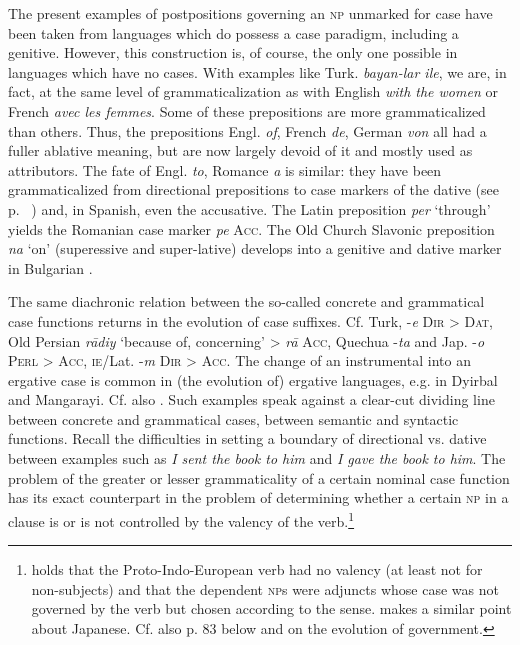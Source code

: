 \label{page88}The present examples of postpositions governing an \textsc{np} unmarked for case have been taken from languages which do possess a case paradigm, including a genitive. However, this construction is, of course, the only one possible in languages which have no cases. With examples like Turk. \textit{bayan-lar ile}, we are, in fact, at the same level of grammaticalization as with English \textit{with the women} or French \textit{avec les femmes}. Some of these prepositions are more grammaticalized than others. Thus, the prepositions Engl. \textit{of}, French \textit{de}, German \textit{von} all had a fuller ablative meaning, but are now largely devoid of it and mostly used as attributors. The fate of Engl. \textit{to}, Romance \textit{a} is similar: they have been grammaticalized from directional prepositions to case markers of the dative (see p.~\pageref{page100}\chk%
)  and, in Spanish, even the accusative. The Latin preposition \textit{per} ‘through’ yields the Romanian case marker \textit{pe} \textsc{Acc}. The Old Church Slavonic preposition \textit{na} ‘on’ (superessive and super-lative) develops into a genitive and dative marker in Bulgarian \citep{Qvonje1979}.

The same diachronic relation between the so-called concrete and grammatical case functions returns in the evolution of case suffixes. Cf. Turk, -\textit{e} \textsc{Dir} {\textgreater} \textsc{Dat}, Old Persian \textit{r\=adiy} ‘because of, concerning’ {\textgreater} \textit{r\=a} \textsc{Acc}, Quechua -\textit{ta} and Jap. -\textit{o} \textsc{Perl} {\textgreater} \textsc{Acc}, \textsc{ie}/Lat. -\textit{m} \textsc{Dir} {\textgreater} \textsc{Acc}. The change of an instrumental into an ergative case is common in (the evolution of) ergative languages, e.g. in Dyirbal and Mangarayi. Cf. also . Such examples speak against a clear-cut dividing line between concrete and grammatical cases, between semantic and syntactic functions. Recall the difficulties in setting a boundary of directional vs. dative between examples such as \textit{I sent the book to him} and \textit{I gave the book to him}. The problem of the greater or lesser grammaticality of a certain nominal case function has its exact counterpart in the problem of determining whether a certain \textsc{np} in a clause is or is not controlled by the valency of the verb.\footnote{\citet[357--359]{Meillet1934} holds that the Proto-Indo-European verb had no valency (at least not for non-subjects) and that the dependent \textsc{np}s were adjuncts whose case was not governed by the verb but chosen according to the sense. \citet{Coseriu1979} makes a similar point about Japanese. Cf. also p. 83 below and \citealt[§4.2]{Lehmann1983} on the evolution of government.}

